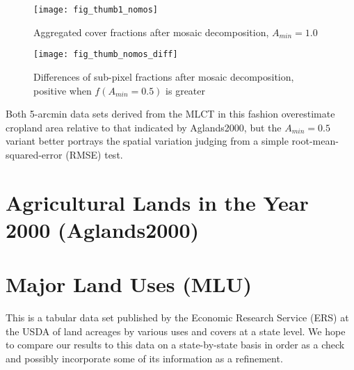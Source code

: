 \begin{figure} 
\begin{center}
  


\texttt{[image: fig\_thumb1\_nomos]}
\end{center} 
\caption{Aggregated cover fractions after mosaic decomposition, $A_{min}=1.0$}
\label{fig:thumb1_nomos}
\end{figure} 

\begin{figure} 
\begin{center}
  

\texttt{[image: fig\_thumb\_nomos\_diff]}
\end{center} 
\caption{Differences of sub-pixel fractions after mosaic
  decomposition, positive when $f(A_{min} = 0.5)$ is greater}
\label{fig:thumb_diff}
\end{figure} 





Both 5-arcmin data sets derived from the MLCT in this fashion
overestimate cropland area relative to that indicated by Aglands2000,
but the $A_{min} = 0.5$ variant better portrays the spatial variation
judging from a simple root-mean-squared-error (RMSE)
test. 

\section{Agricultural Lands in the Year 2000 (Aglands2000)}
\label{sec:aglands2000}

\citet{Ramankutty2008}

  

  
\section{Major Land Uses (MLU)}
\label{sec:mlu}

This is a tabular data set published by the Economic Research Service
(ERS) at the USDA of land acreages by various uses and covers at a
state level.  We hope to compare our results to this data on a
state-by-state basis in order as a check and possibly incorporate some
of its information as a refinement.


